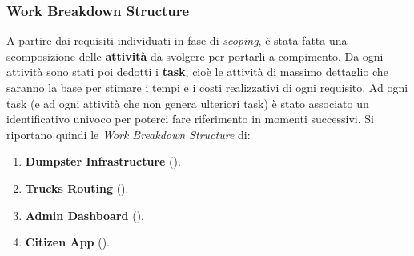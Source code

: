 \subsubsection{Work Breakdown Structure}
A partire dai requisiti individuati in fase di \textit{scoping}, è stata fatta una scomposizione delle \textbf{attività} da svolgere per portarli a compimento.
Da ogni attività sono stati poi dedotti i \textbf{task}, cioè le attività di massimo dettaglio che saranno la base per stimare i tempi e i costi realizzativi di ogni requisito.
Ad ogni task (e ad ogni attività che non genera ulteriori task) è stato associato un identificativo univoco per poterci fare riferimento in momenti successivi.
Si riportano quindi le \textit{Work Breakdown Structure} di:
\begin{enumerate}
    \item \textbf{Dumpster Infrastructure} ().
    \item \textbf{Trucks Routing} ().
    \item \textbf{Admin Dashboard} ().
    \item \textbf{Citizen App} ().
\end{enumerate}

